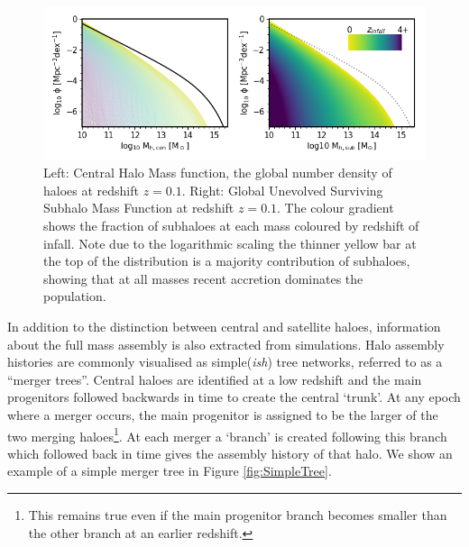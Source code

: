 \begin{figure}[h]
	\centering
	\includegraphics[width = \linewidth]{Figures/Chapter1/SubHaloes_byz.png}
    \caption{Left: Central Halo Mass function, the global number density of haloes at redshift $z=0.1$. Right: Global Unevolved Surviving Subhalo Mass Function at redshift $z=0.1$. The colour gradient shows the fraction of subhaloes at each mass coloured by redshift of infall. Note due to the logarithmic scaling the thinner yellow bar at the top of the distribution is a majority contribution of subhaloes, showing that at all masses recent accretion dominates the population.}
	\label{fig:SubHaloes_byz}
\end{figure}

In addition to the distinction between central and satellite haloes, information about the full mass assembly is also extracted from simulations. Halo assembly histories are commonly visualised as simple(\textit{ish}) tree networks, referred to as a ``merger trees''. Central haloes are identified at a low redshift and the main progenitors followed backwards in time to create the central `trunk'. At any epoch where a merger occurs, the main progenitor is assigned to be the larger of the two merging haloes\footnote{This remains true even if the main progenitor branch becomes smaller than the other branch at an earlier redshift.}. At each merger a `branch' is created following this branch which followed back in time gives the assembly history of that halo. We show an example of a simple merger tree in Figure \ref{fig:SimpleTree}.

